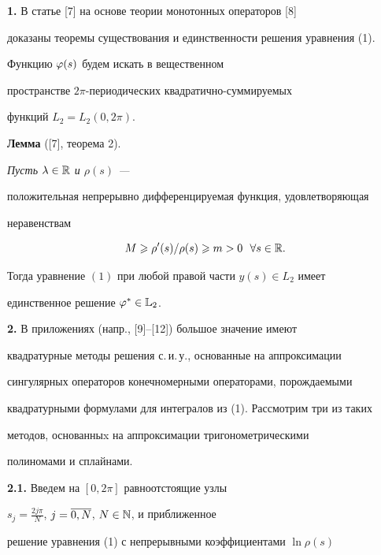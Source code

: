 \medskip





{\bf 1.} В статье [7] на основе теории монотонных операторов [8] 


доказаны теоремы существования и единственности решения уравнения (1).


Функцию $\varphi(s)$ будем искать в вещественном 


пространстве $2\pi$-периодических квад\-ра\-тич\-но-суммируемых


функций $L_2=L_2(0,2\pi)$.


\medskip





{\bf Лемма} ([7], теорема 2). {\it Пусть $\lambda \in \Bbb R$ и $\rho(s)$ ---


положительная непрерывно дифференцируемая функция, удовлетворяющая


неравенствам


$$


M\gea \rho'(s)/\rho(s)\gea m >0\ \ \forall s\in\Bbb R.


$$


Тогда уравнение $(1)$ при любой правой части $y(s)\in L_2$ имеет 


единственное решение $\varphi^*\in \Bbb L_2$.


}


\medskip





{\bf 2.} В приложениях (напр., [9]--[12]) большое значение имеют 


квадратурные методы решения с.\,и.\,у., основанные на аппроксимации 


сингулярных операторов конечномерными операторами, порождаемыми 


квадратурными формулами для интегралов из (1). Рассмотрим три из таких 


методов, основанныx на аппроксимации тригонометрическими 


полиномами и сплайнами.


\medskip





{\bf 2.1.} Введем на $[0,2\pi]$ равноотстоящие узлы


$s_j = \frac{2j\pi}{N}$, $j=\overline{0,N}$, $N\in \Bbb N$, и приближенное 


решение уравнения (1) с непрерывными коэффициентами $\ln \rho(s)$


